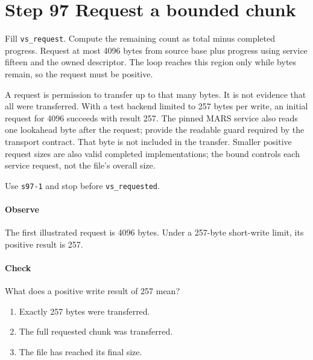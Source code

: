 \section{Step 97 Request a bounded chunk}
Fill \texttt{vs\_request}. Compute the remaining count as total minus completed progress. Request at most 4096 bytes from source base plus progress using service fifteen and the owned descriptor. The loop reaches this region only while bytes remain, so the request must be positive.

A request is permission to transfer up to that many bytes. It is not evidence that all were transferred. With a test backend limited to 257 bytes per write, an initial request for 4096 succeeds with result 257. The pinned MARS service also reads one lookahead byte after the request; provide the readable guard required by the transport contract. That byte is not included in the transfer. Smaller positive request sizes are also valid completed implementations; the bound controls each service request, not the file's overall size.

Use \texttt{s97-1} and stop before \texttt{vs\_requested}.

\paragraph{Observe} The first illustrated request is 4096 bytes. Under a 257-byte short-write limit, its positive result is 257.

\paragraph{Check} What does a positive write result of 257 mean?
\begin{enumerate}[label=\Alph*.]
  \item Exactly 257 bytes were transferred.
  \item The full requested chunk was transferred.
  \item The file has reached its final size.
\end{enumerate}
